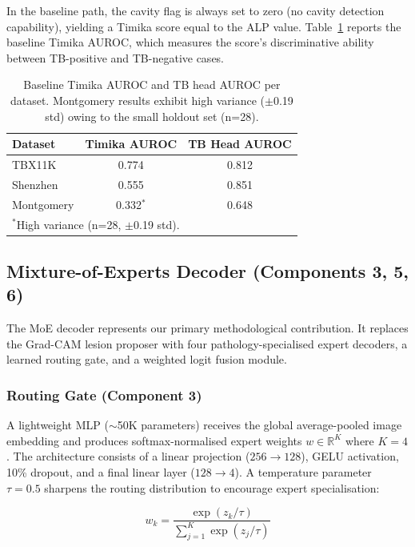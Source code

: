 \documentclass{article}
\begin{document}
In the baseline path, the cavity flag is always set to zero (no cavity detection capability), yielding a Timika score equal to the ALP value. Table~\ref{tab:baseline_timika} reports the baseline Timika AUROC, which measures the score's discriminative ability between TB-positive and TB-negative cases.

\begin{table}[t]
\caption{Baseline Timika AUROC and TB head AUROC per dataset. Montgomery results exhibit high variance ($\pm$0.19 std) owing to the small holdout set (n=28).}
\label{tab:baseline_timika}
\vskip 0.1in
\centering
\begin{tabular}{lcc}
\toprule
Dataset & Timika AUROC & TB Head AUROC \\
\midrule
TBX11K & 0.774 & 0.812 \\
Shenzhen & 0.555 & 0.851 \\
Montgomery & 0.332$^*$ & 0.648 \\
\bottomrule
\multicolumn{3}{l}{\footnotesize $^*$High variance (n=28, $\pm$0.19 std).}
\end{tabular}
\end{table}

\subsection{Mixture-of-Experts Decoder (Components 3, 5, 6)}

The MoE decoder represents our primary methodological contribution. It replaces the Grad-CAM lesion proposer with four pathology-specialised expert decoders, a learned routing gate, and a weighted logit fusion module.

\subsubsection{Routing Gate (Component 3)}

A lightweight MLP ($\sim$50K parameters) receives the global average-pooled image embedding and produces softmax-normalised expert weights $w \in \mathbb{R}^{K}$ where $K=4$. The architecture consists of a linear projection ($256 \rightarrow 128$), GELU activation, 10\% dropout, and a final linear layer ($128 \rightarrow 4$). A temperature parameter $\tau = 0.5$ sharpens the routing distribution to encourage expert specialisation:

\begin{equation}
w_k = \frac{\exp(z_k / \tau)}{\sum_{j=1}^{K} \exp(z_j / \tau)}
\end{equation}
\end{document}
